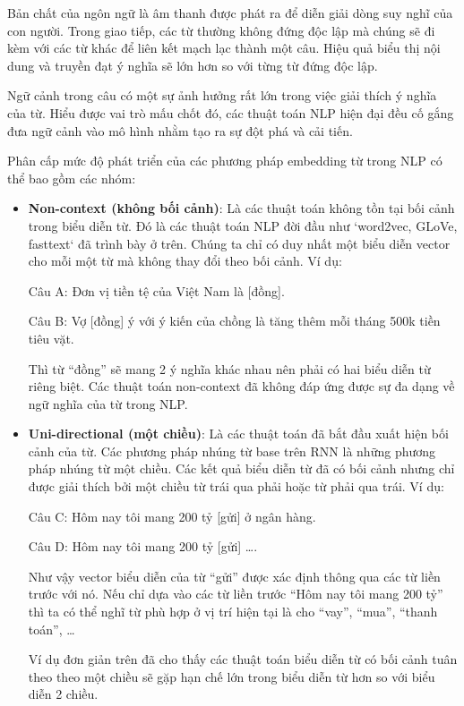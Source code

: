 Bản chất của ngôn ngữ là âm thanh được phát ra để diễn giải dòng suy nghĩ của con người. Trong giao tiếp, các từ thường không đứng độc lập mà chúng sẽ đi kèm với các từ khác để liên kết mạch lạc thành một câu. Hiệu quả biểu thị nội dung và truyền đạt ý nghĩa sẽ lớn hơn so với từng từ đứng độc lập.

Ngữ cảnh trong câu có một sự ảnh hưởng rất lớn trong việc giải thích ý nghĩa của từ. Hiểu được vai trò mấu chốt đó, các thuật toán NLP hiện đại đều cố gắng đưa ngữ cảnh vào mô hình nhằm tạo ra sự đột phá và cải tiến.

Phân cấp mức độ phát triển của các phương pháp embedding từ trong NLP có thể bao gồm các nhóm:
\begin{itemize}
    \item \textbf{Non-context (không bối cảnh)}: Là các thuật toán không tồn tại bối cảnh trong biểu diễn từ. Đó là các thuật toán NLP đời đầu như `word2vec, GLoVe, fasttext` đã trình bày ở trên. Chúng ta chỉ có duy nhất một biểu diễn vector cho mỗi một từ mà không thay đổi theo bối cảnh. Ví dụ:

    Câu A: Đơn vị tiền tệ của Việt Nam là [đồng].
    
    Câu B: Vợ [đồng] ý với ý kiến của chồng là tăng thêm mỗi tháng 500k tiền tiêu vặt.
    
    Thì từ ``đồng'' sẽ mang 2 ý nghĩa khác nhau nên phải có hai biểu diễn từ riêng biệt. Các thuật toán non-context đã không đáp ứng được sự đa dạng về ngữ nghĩa của từ trong NLP.

    \item \textbf{Uni-directional (một chiều)}: Là các thuật toán đã bắt đầu xuất hiện bối cảnh của từ. Các phương pháp nhúng từ base trên RNN là những phương pháp nhúng từ một chiều. Các kết quả biểu diễn từ đã có bối cảnh nhưng chỉ được giải thích bởi một chiều từ trái qua phải hoặc từ phải qua trái. Ví dụ:

    Câu C: Hôm nay tôi mang 200 tỷ [gửi] ở ngân hàng.

    Câu D: Hôm nay tôi mang 200 tỷ [gửi] \dots.

    Như vậy vector biểu diễn của từ ``gửi'' được xác định thông qua các từ liền trước với nó. Nếu chỉ dựa vào các từ liền trước ``Hôm nay tôi mang 200 tỷ'' thì ta có thể nghĩ từ phù hợp ở vị trí hiện tại là cho ``vay'', ``mua'', ``thanh toán'', \dots

    Ví dụ đơn giản trên đã cho thấy các thuật toán biểu diễn từ có bối cảnh tuân theo theo một chiều sẽ gặp hạn chế lớn trong biểu diễn từ hơn so với biểu diễn 2 chiều.


\end{itemize}

